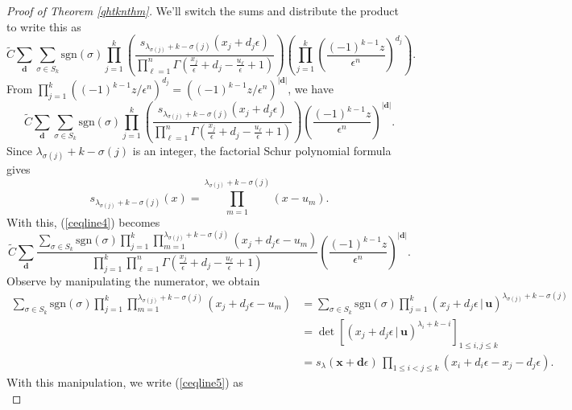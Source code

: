 \documentclass[12pt]{article}
\theoremstyle{plain}
\theoremstyle{definition}
\newcommand{\xb}{\boldsymbol{x}}
\newcommand{\db}{\boldsymbol{d}}
\newcommand{\ub}{\boldsymbol{u}}
\begin{document}
\begin{proof}[Proof of Theorem \ref{qhtknthm}]
We'll switch the sums and distribute the product to write this as 
\begin{equation}
     \widetilde{C} \sum_{\db}  \sum_{\sigma \in S_k} \mathrm{sgn}(\sigma)\prod_{j=1} ^k \left(\frac{s_{\lambda_{\sigma(j)}+k-{\sigma(j)}} (x_j+d_j \epsilon)}{ \prod_{\ell=1} ^n \Gamma \left(\frac{x_j}{\epsilon}+d_j- \frac{u_\ell}{\epsilon}+1\right)}  \right) \left (\prod_{j=1} ^k\left(\frac{(-1)^{k-1} z}{\epsilon^n}\right)^{d_j}  \right).
\end{equation}
From $\prod_{j=1}^k \left({(-1)^{k-1} z}/{\epsilon^n}\right)^{d_j} = \left({(-1)^{k-1} z}/{\epsilon^n}\right)^{|\db|}$, we have
\begin{equation}\label{ceqline4}
    \widetilde{C} \sum_{\db}  \sum_{\sigma \in S_k} \mathrm{sgn}(\sigma)\prod_{j=1} ^k \left(\frac{s_{\lambda_{\sigma(j)}+k-{\sigma(j)}} (x_j+d_j \epsilon)}{ \prod_{\ell=1} ^n \Gamma \left(\frac{x_j}{\epsilon}+d_j- \frac{u_\ell}{\epsilon}+1\right)}  \right) \left(\frac{(-1)^{k-1} z}{\epsilon^n}\right)^{|\db|}.
\end{equation}
Since ${\lambda_{\sigma(j)}+k-{\sigma(j)}}$ is an integer, the factorial Schur polynomial formula gives $$
s_{\lambda_{\sigma(j)}+k-{\sigma(j)}}(x) = \prod_{m=1} ^ {\lambda_{\sigma(j)}+k-{\sigma(j)}} (x-u_m).
$$
With this, (\ref{ceqline4}) becomes
\begin{equation}\label{ceqline5}
    \widetilde{C}  \sum_{\db} \frac{\sum_{\sigma \in S_k} \mathrm{sgn}(\sigma)\prod_{j=1} ^k \prod_{m=1} ^ {\lambda_{\sigma(j)}+k-{\sigma(j)}} (x_j+d_j \epsilon-u_m)}{\prod_{j=1} ^k  \prod_{\ell=1} ^n \Gamma \left(\frac{x_j}{\epsilon}+d_j- \frac{u_\ell}{\epsilon}+1\right)} \left(\frac{(-1)^{k-1} z}{\epsilon^n}\right)^{|\db|}. 
\end{equation}
Observe by manipulating the numerator, we obtain
\begin{align*}
    \sum_{\sigma \in S_k} \mathrm{sgn}(\sigma)\prod_{j=1} ^k \prod_{m=1} ^ {\lambda_{\sigma(j)}+k-{\sigma(j)}} (x_j+d_j\epsilon-u_m) &= \sum_{\sigma \in S_k} \mathrm{sgn}(\sigma)\prod_{j=1} ^k  (x_j +d_j\epsilon \, | \, \ub)^{\lambda_{\sigma(j)}+k-{\sigma(j)}}\\
    &= \det \left[(x_j +d_j\epsilon \, | \, \ub)^{\lambda_{i}+k-{i}}\right]_{1\leq i,j \leq k}\\
    &= s_\lambda (\xb+\db \epsilon) \, \prod_{1\leq i <j \leq k} (x_i+d_i\epsilon - x_j - d_j \epsilon).
\end{align*}
With this manipulation, we write (\ref{ceqline5}) as 
\begin{equation}\label{lastofnum}

\end{equation}
\end{proof}
\end{document}
